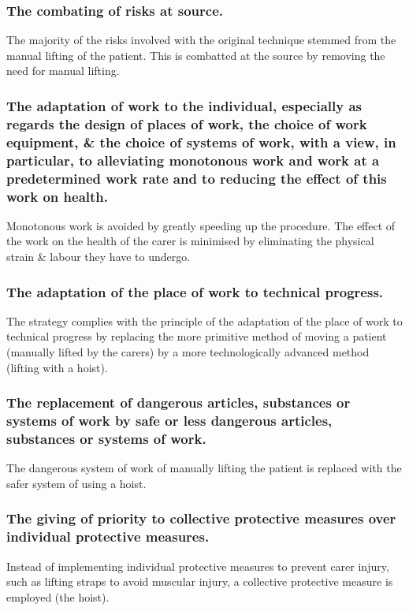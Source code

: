 \documentclass[a4paper]{article}
\begin{document}
\begin{multicols}{2}
\subsubsection{The combating of risks at source.}
The majority of the risks involved with the original technique stemmed from the manual lifting of the patient. 
This is combatted at the source by removing the need for manual lifting.

\subsubsection{The adaptation of work to the individual, especially as regards the design of places of work, the choice of work equipment, \& the choice of systems of work, with a view, in particular, to alleviating monotonous work and work at a predetermined work rate and to reducing the effect of this work on health.}
Monotonous work is avoided by greatly speeding up the procedure.
The effect of the work on the health of the carer is minimised by eliminating the physical strain \& labour they have to
undergo.

\subsubsection{The adaptation of the place of work to technical progress.}
The strategy complies with the principle of the adaptation of the place of work to technical progress by replacing the
more primitive method of moving a patient (manually lifted by the carers) by a more technologically advanced method
(lifting with a hoist).

\subsubsection{The replacement of dangerous articles, substances or systems of work by safe or less dangerous articles, substances or systems of work.}
The dangerous system of work of manually lifting the patient is replaced with the safer system of using a hoist.

\subsubsection{The giving of priority to collective protective measures over individual protective measures.}
Instead of implementing individual protective measures to prevent carer injury, such as lifting straps to avoid muscular
injury, a collective protective measure is employed (the hoist).


\end{multicols}
\end{document}
